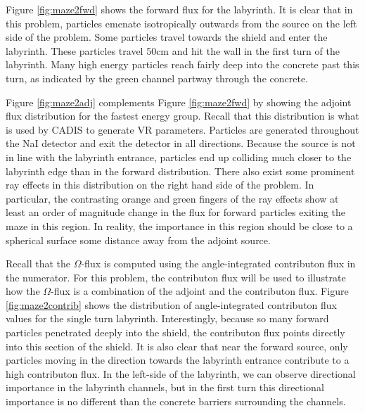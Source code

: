 Figure \ref{fig:maze2fwd} shows the forward flux for the labyrinth. It is
clear that in this problem, particles emenate isotropically outwards from the
source on the left side of the problem. Some particles travel towards the
shield and enter the labyrinth. These particles travel 50cm and hit the wall in
the first turn of the labyrinth. Many high energy particles reach fairly deep
into the concrete past this turn, as indicated by the green channel partway
through the concrete.

Figure \ref{fig:maze2adj} complements Figure \ref{fig:maze2fwd} by showing the
adjoint flux distribution for the fastest energy group. Recall that this
distribution is what is used by CADIS to generate VR parameters. Particles are
generated throughout the NaI detector and exit the detector in all directions.
Because the source is not in line with the labyrinth entrance, particles end up
colliding much closer to the labyrinth edge than in the forward distribution.
There also exist some prominent ray effects in this distribution on the right
hand side of the problem. In particular, the contrasting orange and green
fingers of the ray effects show at least an order of magnitude change in the
flux for forward particles exiting the maze in this region. In reality, the
importance in this region should be close to a spherical surface some distance
away from the adjoint source.

Recall that the $\Omega$-flux is computed using the angle-integrated contributon
flux in the numerator. For this problem, the contributon flux will be used to
illustrate how the $\Omega$-flux is a combination of the adjoint and the
contributon flux. Figure \ref{fig:maze2contrib} shows the distribution of
angle-integrated contributon flux values for the single turn labyrinth.
Interestingly, because so many forward particles penetrated deeply into the
shield, the contributon flux points directly into this section of the shield. It
is also clear that near the forward source, only particles moving in the
direction towards the labyrinth entrance contribute to a high contributon flux.
In the left-side of the labyrinth, we can observe directional importance in the
labyrinth channels, but in the first turn this directional importance is no
different than the concrete barriers surrounding the channels.

